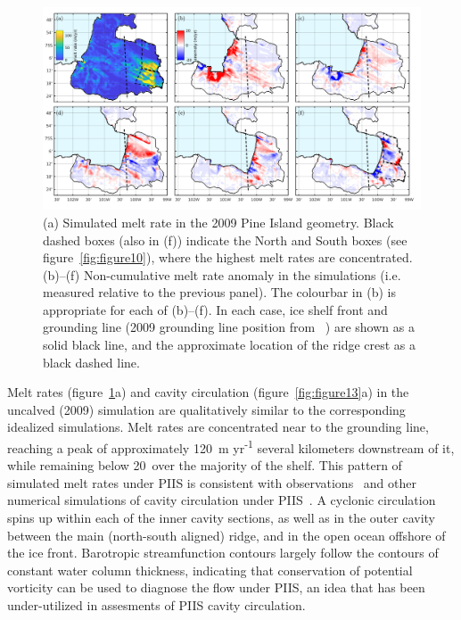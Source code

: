 \documentclass[draft]{agujournal2019}
\begin{document}
\begin{figure}
    \centering
    \includegraphics[width = \textwidth]{../make_figures/plots/figure11_labelled.pdf}
    \caption{(a) Simulated melt rate in the 2009 Pine Island geometry. Black dashed boxes (also in (f)) indicate the North and South boxes (see figure~\ref{fig:figure10}), where the highest melt rates are concentrated. (b)--(f) Non-cumulative melt rate anomaly in the simulations (i.e. measured relative to the previous panel). The colourbar in (b) is appropriate for each of (b)--(f). In each case, ice shelf front and grounding line (2009 grounding line position from ~\cite{Joughin2010GRL}) are shown as a solid black line, and the approximate location of the ridge crest as a black dashed line.} 
    \label{fig:figure11}
\end{figure}


Melt rates (figure~\ref{fig:figure11}a) and cavity circulation (figure~\ref{fig:figure13}a) in the uncalved (2009) simulation are qualitatively similar to the corresponding idealized simulations. Melt rates are concentrated near to the grounding line, reaching a peak of approximately 120~m yr\textsuperscript{-1} several kilometers downstream of it, while remaining below 20~\mpryr over the majority of the shelf. This pattern of simulated melt rates under PIIS is consistent with observations~\cite{Dutrieux2013Cryosphere} and other numerical simulations of cavity circulation under PIIS~\cite{Heimbach2012AnnGlac}. A cyclonic circulation spins up within each of the inner cavity sections, as well as in the outer cavity between the main (north-south aligned) ridge, and in the open ocean offshore of the ice front. Barotropic streamfunction contours largely follow the contours of constant water column thickness, indicating that conservation of potential vorticity can be used to diagnose the flow under PIIS, an idea that has been under-utilized in assesments of PIIS cavity circulation.
\end{document}
